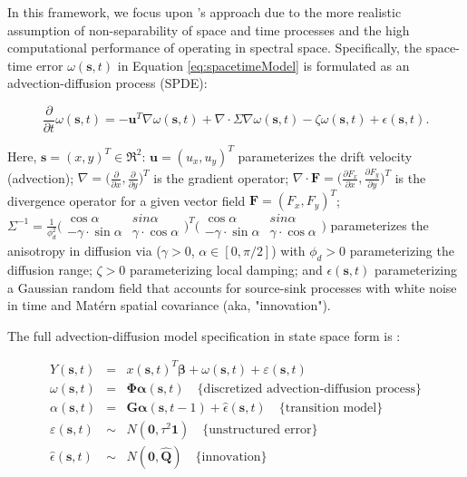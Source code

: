 \documentclass[letterpaper,portrait,11pt]{scrartcl}
\numberwithin{equation}{section}    %
\numberwithin{figure}{section}    %
\numberwithin{table}{section}       %
\begin{document}
In this framework, we focus upon \textcite{sigrist2015stochastic}'s approach due to the more realistic assumption of non-separability of space and time processes and the high computational performance of operating in spectral space. Specifically, the space-time error $\omega(\bm{s},t)$ in Equation \ref{eq:spacetimeModel} is formulated as an advection-diffusion process (SPDE):

\begin{equation}
\label{eq:adevectionDiffsionSPDE}
\frac{\partial}{\partial t} \omega(\bm{s},t) = - \bm{u}^T \nabla \omega(\bm{s},t)
+ \nabla \cdotp \Sigma \nabla \omega(\bm{s},t) - \zeta  \omega(\bm{s},t) + \epsilon(\bm{s},t).
\end{equation}

Here, $\bm{s}=(x,y)^T \in \Re^2$: $\bm{u}=(u_x, u_y)^T$ parameterizes the drift velocity (advection); $\nabla = \Big( \frac{\partial}{\partial x}, \frac{\partial}{\partial y} \Big)^T$  is the gradient operator;  $\nabla \cdotp \bm{F} = \Big( \frac{\partial F_x}{\partial x}, \frac{\partial F_y}{\partial y} \Big)^T$ is the divergence operator for a given vector field $\bm{F}=(F_x, F_y)^T$; $\Sigma^{-1} = \frac{1}{\phi^{2}_{d} }    
  \Big( 
  \begin{array}{cc}
  \cos \alpha & sin \alpha \\ 
  - \gamma \cdot \sin \alpha & \gamma \cdot \cos \alpha
  \end{array} 
  \Big)^T 
  \Big( 
  \begin{array}{cc}
  \cos \alpha & sin \alpha \\ 
  - \gamma \cdot \sin \alpha & \gamma \cdot \cos \alpha
  \end{array} 
  \Big) $ parameterizes the anisotropy in diffusion via ($\gamma > 0$, $\alpha \in [0,\pi/2]$) with $\phi_d > 0$  parameterizing the diffusion range; $\zeta > 0$ parameterizing local damping; and $\epsilon(\bm{s},t)$ parameterizing a Gaussian random field that accounts for source-sink processes with white noise in time and Mat\'{e}rn spatial covariance (aka, "innovation").
  
  
The full advection-diffusion model specification in state space form is  \parencite{sigrist2015stochastic}:
  
  \begin{eqnarray*}
    Y(\bm{s},t) &=& x(\bm{s},t)^{T} \bm{\beta} +  \omega(\bm{s},t) + \varepsilon(\bm{s},t) \\
    \omega(\bm{s},t) &=& \bm{\Phi} \bm{\alpha} (\bm{s},t)  \quad \text{\{discretized advection-diffusion process\}}\\
    \alpha (\bm{s},t)&=& \bm{G} \bm{\alpha} (\bm{s},t-1) + \hat{\epsilon}(\bm{s},t)  \quad \text{\{transition model\}} \\
    \varepsilon(\bm{s},t) &\sim& N(\bm{0}, \tau^2 \bm{1} ) \quad \text{\{unstructured error\}}\\
    \hat{\epsilon}(\bm{s},t) &\sim& N(\bm{0}, \bm{\hat{Q}})  \quad \text{\{innovation\}}\\
  \end{eqnarray*}  
  
\end{document}
